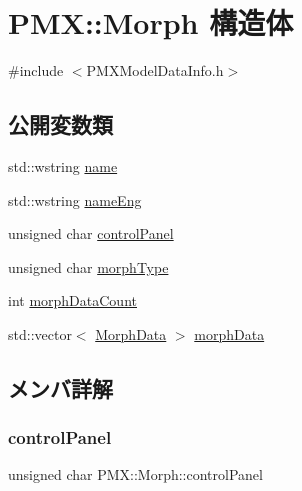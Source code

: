 \hypertarget{struct_p_m_x_1_1_morph}{}\section{P\+MX\+:\+:Morph 構造体}
\label{struct_p_m_x_1_1_morph}


{\ttfamily \#include $<$P\+M\+X\+Model\+Data\+Info.\+h$>$}

\subsection*{公開変数類}
\begin{DoxyCompactItemize}
\item 
std\+::wstring \mbox{\hyperlink{struct_p_m_x_1_1_morph_a32a9e0311052f098ceec0a369b9471b6}{name}}
\item 
std\+::wstring \mbox{\hyperlink{struct_p_m_x_1_1_morph_a325014d593ec239dc070ba72a7fe5712}{name\+Eng}}
\item 
unsigned char \mbox{\hyperlink{struct_p_m_x_1_1_morph_a71e416b60ead6282d8d2a19b2c173f90}{control\+Panel}}
\item 
unsigned char \mbox{\hyperlink{struct_p_m_x_1_1_morph_a5d7660a1ada5845ddf58b2c43a2298da}{morph\+Type}}
\item 
int \mbox{\hyperlink{struct_p_m_x_1_1_morph_aafd5a74caf4844b5d14bf6b6e59226b1}{morph\+Data\+Count}}
\item 
std\+::vector$<$ \mbox{\hyperlink{union_p_m_x_1_1_morph_data}{Morph\+Data}} $>$ \mbox{\hyperlink{struct_p_m_x_1_1_morph_aca15999dc3b3a59e2f30c7cc059d50d2}{morph\+Data}}
\end{DoxyCompactItemize}


\subsection{メンバ詳解}
\mbox{\label{struct_p_m_x_1_1_morph_a71e416b60ead6282d8d2a19b2c173f90}} 
\subsubsection{\texorpdfstring{control\+Panel}{controlPanel}}
{\footnotesize\ttfamily unsigned char P\+M\+X\+::\+Morph\+::control\+Panel}

\mbox{\label{struct_p_m_x_1_1_morph_aca15999dc3b3a59e2f30c7cc059d50d2}} 
